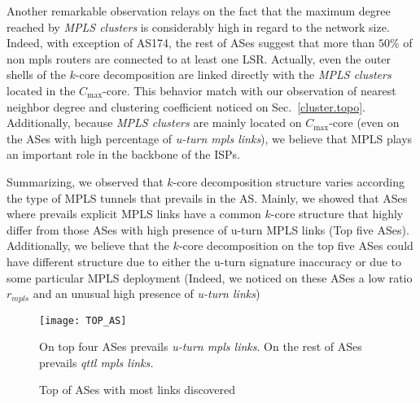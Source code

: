 Another remarkable observation  relays on the fact that the maximum degree
reached by \textit{MPLS clusters} is considerably high in regard to the network
size. Indeed, with exception of AS174, the rest of ASes suggest that more than
$50\%$ of non mpls routers are connected  to at least one LSR. Actually, even
the outer shells of the $k$-core decomposition are linked directly with the
\textit{MPLS clusters} located in the $C_{\max}$-core. This behavior match with
our observation of nearest neighbor degree and clustering coefficient noticed on
Sec.~\ref{cluster.topo}. Additionally, because \textit{MPLS clusters} are
mainly located on $C_{\max}$-core (even on the ASes with high percentage of
\textit{u-turn mpls links}), we believe that MPLS plays an important role in the
backbone of the ISPs.

Summarizing, we observed that  $k$-core decomposition structure varies according
the type of MPLS tunnels that prevails in the AS. Mainly, we showed that ASes where prevails 
explicit MPLS links have a common $k$-core structure that highly differ from those ASes with
high presence of u-turn MPLS links (Top five ASes). Additionally, we believe that the $k$-core decomposition  on the top five ASes could have different structure due to either  the
u-turn signature inaccuracy or due to some particular MPLS deployment (Indeed, we noticed on these
ASes a low ratio $r_{mpls}$ and an unusual  high presence of  \textit{u-turn links})

\begin{figure}[!htb]
  \begin{center}
    \texttt{[image: TOP\_AS]}
  \end{center}
  \caption{Top of ASes with most links discovered} On top four ASes
  prevails \textit{u-turn mpls links}. On the rest of ASes prevails \textit{qttl
  mpls links.}
  \label{top_as}
\end{figure}

